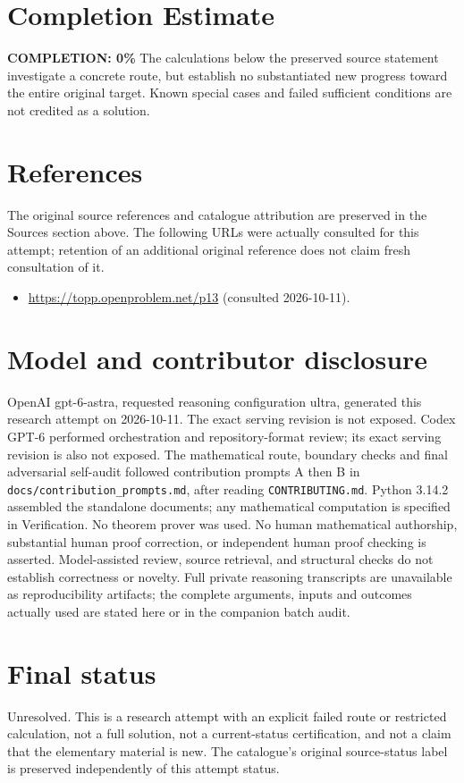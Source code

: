 \documentclass[11pt,a4paper]{article}
\begin{document}
\section{Completion Estimate}
\noindent\textbf{COMPLETION: 0\%}
The calculations below the preserved source statement investigate a concrete route,
but establish no substantiated new progress toward the entire original target.
Known special cases and failed sufficient conditions are not credited as a solution.
\section{References}
The original source references and catalogue attribution are preserved in the
Sources section above. The following URLs were actually consulted for this attempt;
retention of an additional original reference does not claim fresh consultation of it.
\begin{itemize}
\item \url{https://topp.openproblem.net/p13} (consulted 2026-10-11). 
\end{itemize}
\section{Model and contributor disclosure}
OpenAI gpt-6-astra, requested reasoning configuration ultra, generated this research
attempt on 2026-10-11. The exact serving revision is not exposed. Codex GPT-6
performed orchestration and repository-format review; its exact serving revision
is also not exposed. The mathematical route, boundary checks and final adversarial
self-audit followed contribution prompts A then B in
\texttt{docs/contribution\_prompts.md}, after reading \texttt{CONTRIBUTING.md}.
Python 3.14.2 assembled the standalone documents; any mathematical computation is
specified in Verification. No theorem prover was used. No human mathematical
authorship, substantial human proof correction, or independent human proof checking
is asserted. Model-assisted review, source retrieval, and structural checks do not
establish correctness or novelty. Full private reasoning transcripts are unavailable
as reproducibility artifacts; the complete arguments, inputs and outcomes actually
used are stated here or in the companion batch audit.
\section{Final status}
Unresolved. This is a research attempt with an explicit failed route or restricted
calculation, not a full solution, not a current-status certification, and not a claim
that the elementary material is new. The catalogue's original source-status label
is preserved independently of this attempt status.
\end{document}
